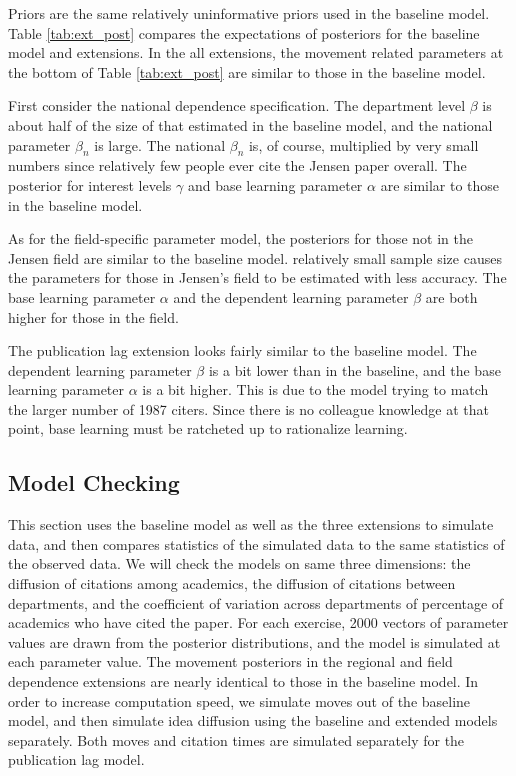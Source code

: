 \setcounter{footnote}{0}

Priors are the same relatively uninformative priors used in the baseline model.  Table \ref{tab:ext_post} compares the expectations of posteriors for the baseline model and extensions.\footnotemark{}
In the all extensions, the movement related parameters at the bottom of Table \ref{tab:ext_post} are
similar to those in the baseline model.

First consider the national dependence specification.
The department level $\beta$ is about half of the size of that
estimated in the baseline model, and the national parameter $\beta_n$ is large.
The national $\beta_n$ is, of course, multiplied by very small numbers since relatively few people ever
cite the Jensen paper overall.  The posterior for interest levels $\gamma$ and base learning parameter
$\alpha$ are similar to those in the baseline model.

As for the field-specific parameter model, the posteriors for those
not in the Jensen field are similar to the baseline model. 
relatively small sample size causes the
parameters for those in Jensen's field to be estimated with less
accuracy. The base learning parameter
$\alpha$ and the dependent learning parameter $\beta$  are both higher for those in the field.

The publication lag extension looks fairly similar to the baseline model.  The dependent learning parameter $\beta$ is a bit lower than in the baseline, and the base learning parameter  $\alpha$ is a bit higher.  This is due to the model trying to match the larger number of 1987 citers.  Since there is no colleague knowledge at that point, base learning must be ratcheted up to rationalize learning.

\subsection{Model Checking}
\label{sec:modcheck}

This section uses the baseline model as well as the three extensions to
simulate data, and then compares statistics of the simulated data to
the same statistics of the observed data. We will check the models on same
three dimensions: the diffusion of citations among academics, the
diffusion of citations between departments, and the coefficient of
variation across departments of percentage of academics who have cited the
paper. For each exercise, 2000 vectors of parameter values are drawn
from the posterior distributions, and the model is simulated at each parameter value.
The movement posteriors in the regional and field dependence extensions are
nearly identical to those in the baseline model.
In order to increase computation speed, we simulate moves out of the
baseline model, and then simulate idea diffusion using the baseline and extended
models separately.  Both moves and citation times are simulated separately for
the publication lag model.

